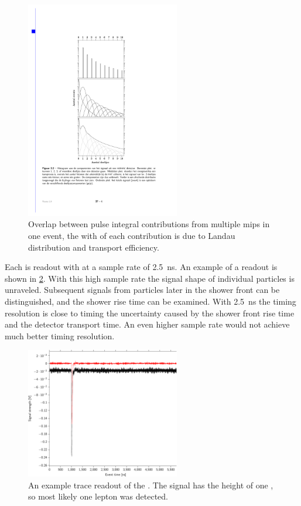 \begin{figure}
    \centering
    \includegraphics[width=0.6\textwidth]
                    {plots/experiment/ph_histogram_contrib}
    \caption{Overlap between pulse integral contributions from multiple mips in one event, the with of each contribution is due to Landau distribution and transport efficiency.}
    \label{fig:ph_histogram_contrib}
\end{figure}

Each \pmt is readout with \adcs at a sample rate of \SI{2.5}{\ns}. An example of a readout is shown in \cref{fig:trace}. With this high sample rate the signal shape of individual particles is unraveled. Subsequent signals from particles later in the shower front can be distinguished, and the shower rise time can be examined. With \SI{2.5}{\ns} the timing resolution is close to timing the uncertainty caused by the shower front rise time and the detector transport time. An even higher sample rate would not achieve much better timing resolution.

\begin{figure}
    \centering
    \includegraphics[width=0.6\textwidth]
                    {plots/experiment/trace}
    \caption{An example trace readout of the \pmt. The signal has the height of one \mip, so most likely one lepton was detected.}
    \label{fig:trace}
\end{figure}


